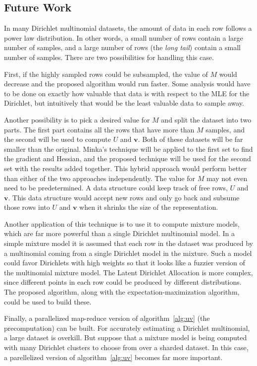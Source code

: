 \documentclass[twoside]{article}
\begin{document}
\subsection{Future Work}

In many Dirichlet multinomial datasets, the amount of data in each row follows a power law distribution.  In other words, a small number of rows contain a large number of samples, and a large number of rows (the \textit{long tail}) contain a small number of samples.  There are two possibilities for handling this case.

First, if the highly sampled rows could be subsampled, the value of $M$ would decrease and the proposed algorithm would run faster. Some analysis would have to be done on exactly how valuable that data is with respect to the MLE for the Dirichlet, but intuitively that would be the least valuable data to sample away.

Another possibility is to pick a desired value for $M$ and split the dataset into two parts.  The first part contains all the rows that have more than $M$ samples, and the second will be used to compute $U$ and $\mathbf{v}$.  Both of these datasets will be far smaller than the original.  Minka's technique will be applied to the first set to find the gradient and Hessian, and the proposed technique will be used for the second set with the results added together.  This hybrid approach would perform better than either of the two approaches independently. The value for $M$ may not even need to be predetermined. A data structure could keep track of free rows, $U$ and $\mathbf{v}$.  This data structure would accept new rows and only go back and subsume those rows into $U$ and $\mathbf{v}$ when it shrinks the size of the representation.

Another application of this technique is to use it to compute mixture models, which are far more powerful than a single Dirichlet multinomial model.  In a simple mixture model it is assumed that each row in the dataset was produced by a multinomial coming from a single Dirichlet model in the mixture.  Such a model could favor Dirichlets with high weights so that it looks like a fuzzier version of the multinomial mixture model.  The Latent Dirichlet Allocation is more complex, since different points in each row could be produced by different distributions.  The proposed algorithm, along with the expectation-maximization algorithm, could be used to build these.

Finally, a parallelized map-reduce version of algorithm~\ref{alg:uv} (the precomputation) can be built.  For accurately estimating a Dirichlet multinomial, a large dataset is overkill.  But suppose that a mixture model is being computed with many Dirichlet clusters to choose from over a sharded dataset.  In this case, a parellelized version of algorithm~\ref{alg:uv}  becomes far more important.
\end{document}
